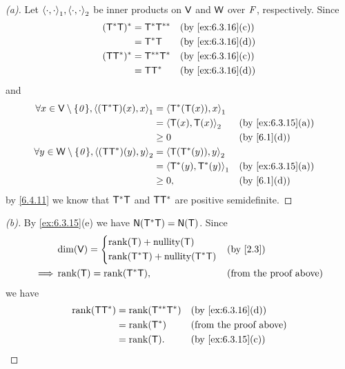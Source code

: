 \begin{proof}[(a)]
	Let \(\inn{\cdot, \cdot}_1, \inn{\cdot, \cdot}_2\) be inner products on \(\mathsf{V}\) and \(\mathsf{W}\) over \(\mathit{F}\), respectively.
	Since
	\begin{align*}
		(\T^* \T)^* & = \T^* \T^{**} &  & \by{ex:6.3.16}[c] \\
		            & = \T^* \T      &  & \by{ex:6.3.16}[d] \\
		(\T \T^*)^* & = \T^{**} \T^* &  & \by{ex:6.3.16}[c] \\
		            & = \T \T^*      &  & \by{ex:6.3.16}[d]
	\end{align*}
	and
	\begin{align*}
		\forall x \in \V \setminus \set{\zv}, \inn{(\T^* \T)(x), x}_1 & = \inn{\T^*(\T(x)), x}_1                          \\
		                                                              & = \inn{\T(x), \T(x)}_2     &  & \by{ex:6.3.15}[a] \\
		                                                              & \geq 0                     &  & \by{6.1}[d]       \\
		\forall y \in \W \setminus \set{\zv}, \inn{(\T \T^*)(y), y}_2 & = \inn{\T(\T^*(y)), y}_2                          \\
		                                                              & = \inn{\T^*(y), \T^*(y)}_1 &  & \by{ex:6.3.15}[a] \\
		                                                              & \geq 0,                    &  & \by{6.1}[d]
	\end{align*}
	by \cref{6.4.11} we know that \(\mathsf{T}^* \mathsf{T}\) and \(\mathsf{T} \mathsf{T}^*\) are positive semidefinite.
\end{proof}

\begin{proof}[(b)]
	By \cref{ex:6.3.15}(e) we have \(\ns{\T^* \T} = \ns{\T}\).
	Since
	\begin{align*}
		         & \dim(\V) = \begin{dcases}
			                      \rk{\T} + \nt{\T} \\
			                      \rk{\T^* \T} + \nt{\T^* \T}
		                      \end{dcases} &  & \by{2.3}                          \\
		\implies & \rk{\T} = \rk{\T^* \T},     &  & \text{(from the proof above)}
	\end{align*}
	we have
	\begin{align*}
		\rk{\T \T^*} & = \rk{\T^{**} \T^*} &  & \by{ex:6.3.16}[d]             \\
		             & = \rk{\T^*}         &  & \text{(from the proof above)} \\
		             & = \rk{\T}.          &  & \by{ex:6.3.15}[c]
	\end{align*}
\end{proof}

